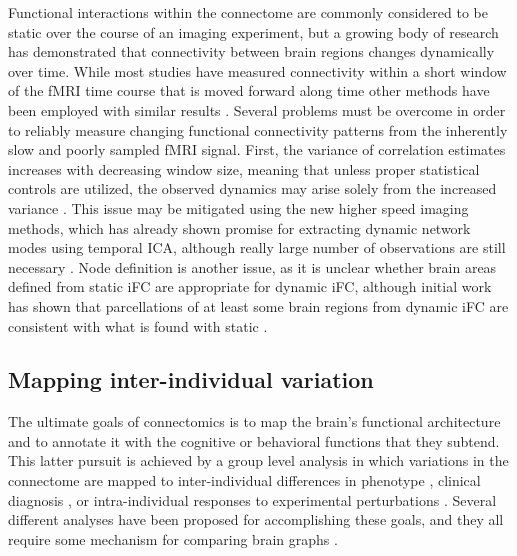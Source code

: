 \documentclass{bmcart}
\begin{document}
Functional interactions within the connectome are commonly considered to be static over the course of an imaging experiment, but a growing body of research has demonstrated that connectivity between brain regions changes dynamically over time\cite{Hutchison2013}. While most studies have measured connectivity within a short window of the fMRI time course that is moved forward along time \cite{Keilholz2013,Chang2010,Yang2014,Allen2014} other methods have been employed with similar results  \cite{Majeed2011,Smith2012}. Several problems must be overcome in order to reliably measure changing functional connectivity patterns from the inherently slow and poorly sampled fMRI signal. First, the variance of correlation estimates increases with decreasing window size, meaning that unless proper statistical controls are utilized, the observed dynamics may arise solely from the increased variance \cite{Handwerker2012}. This issue may be mitigated using the new higher speed imaging methods, which has already shown promise for extracting dynamic network modes using temporal ICA, although really large number of observations are still necessary \cite{Smith2012}. Node definition is another issue, as it is unclear whether brain areas defined from static iFC are appropriate for dynamic iFC, although initial work has shown that parcellations of at least some brain regions from dynamic iFC are consistent with what is found with static \cite{Yang2014}.

\subsection{Mapping inter-individual variation} 

The ultimate goals of connectomics is to map the brain's functional architecture and to annotate it with the cognitive or behavioral functions that they subtend. This latter pursuit is achieved by a group level analysis in which variations in the connectome are mapped to inter-individual differences in phenotype  \cite{Kelly2012}, clinical diagnosis \cite{Castellanos2013}, or intra-individual responses to experimental perturbations \cite{Shirer2012}. Several different analyses have been proposed for accomplishing these goals, and they all require some mechanism for comparing brain graphs \cite{Varoquaux2013}. 
 
\end{document}
